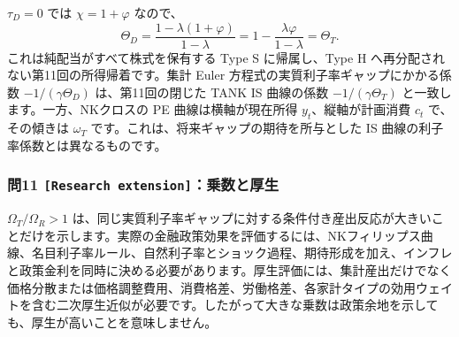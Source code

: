\documentclass[
  japanese,
  lualatex,
  ja=standard,
  11pt,
  a4paper]{ltjsarticle}
\begin{document}
\(\tau_D=0\) では \(\chi=1+\varphi\) なので、 \[
\Theta_D
=\frac{1-\lambda(1+\varphi)}{1-\lambda}
=1-\frac{\lambda\varphi}{1-\lambda}
=\Theta_T.
\] これは純配当がすべて株式を保有する Type S に帰属し、Type H
へ再分配されない第11回の所得帰着です。集計 Euler
方程式の実質利子率ギャップにかかる係数 \(-1/(\gamma\Theta_D)\)
は、第11回の閉じた TANK IS 曲線の係数 \(-1/(\gamma\Theta_T)\)
と一致します。一方、NKクロスの PE 曲線は横軸が現在所得
\(y_t\)、縦軸が計画消費 \(c_t\) で、その傾きは \(\omega_T\)
です。これは、将来ギャップの期待を所与とした IS
曲線の利子率係数とは異なるものです。

\subsubsection{\texorpdfstring{問11
\texttt{{[}Research\ extension{]}}：乗数と厚生}{問11 {[}Research extension{]}：乗数と厚生}}\label{ux554f11-research-extensionux4e57ux6570ux3068ux539aux751f}

\(\Omega_T/\Omega_R>1\)
は、同じ実質利子率ギャップに対する条件付き産出反応が大きいことだけを示します。実際の金融政策効果を評価するには、NKフィリップス曲線、名目利子率ルール、自然利子率とショック過程、期待形成を加え、インフレと政策金利を同時に決める必要があります。厚生評価には、集計産出だけでなく価格分散または価格調整費用、消費格差、労働格差、各家計タイプの効用ウェイトを含む二次厚生近似が必要です。したがって大きな乗数は政策余地を示しても、厚生が高いことを意味しません。
\end{document}
